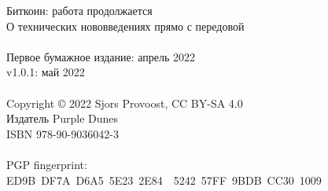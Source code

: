 \newpage
{\setlength{\parindent}{0cm}
\begin{vplace}
Биткоин: работа продолжается\\
О технических нововведениях прямо с передовой\\
\\
Первое бумажное издание: апрель 2022\\
v1.0.1: май 2022\\
\\
Copyright © 2022 Sjors Provoost, CC BY-SA 4.0\\
Издатель Purple Dunes\\
ISBN 978-90-9036042-3\\


\\

PGP fingerprint:\\
ED9B DF7A D6A5 5E23 2E84  5242 57FF 9BDB CC30 1009\\

\end{vplace}
}

